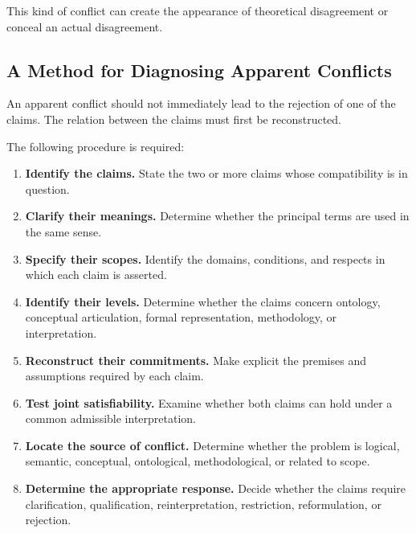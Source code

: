 This kind of conflict can create the appearance of
theoretical disagreement or conceal an actual disagreement.

\subsection{A Method for Diagnosing Apparent Conflicts}

An apparent conflict should not immediately lead to the
rejection of one of the claims. The relation between the
claims must first be reconstructed.

The following procedure is required:

\begin{enumerate}
    \item \textbf{Identify the claims.}
    State the two or more claims whose compatibility is
    in question.

    \item \textbf{Clarify their meanings.}
    Determine whether the principal terms are used in
    the same sense.

    \item \textbf{Specify their scopes.}
    Identify the domains, conditions, and respects in
    which each claim is asserted.

    \item \textbf{Identify their levels.}
    Determine whether the claims concern ontology,
    conceptual articulation, formal representation,
    methodology, or interpretation.

    \item \textbf{Reconstruct their commitments.}
    Make explicit the premises and assumptions required
    by each claim.

    \item \textbf{Test joint satisfiability.}
    Examine whether both claims can hold under a common
    admissible interpretation.

    \item \textbf{Locate the source of conflict.}
    Determine whether the problem is logical, semantic,
    conceptual, ontological, methodological, or related
    to scope.

    \item \textbf{Determine the appropriate response.}
    Decide whether the claims require clarification,
    qualification, reinterpretation, restriction,
    reformulation, or rejection.
\end{enumerate}

